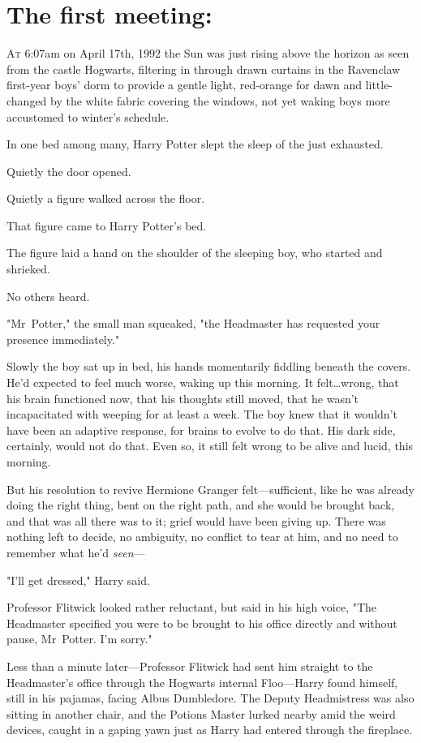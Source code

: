 
\section{The first meeting:}

\lettrine{A}{t} 6:07am on April 17th, 1992 the Sun was just rising above the horizon as seen
from the castle Hogwarts, filtering in through drawn curtains in the Ravenclaw
first-year boys' dorm to provide a gentle light, red-orange for dawn and
little-changed by the white fabric covering the windows, not yet waking boys
more accustomed to winter's schedule.

In one bed among many, Harry Potter slept the sleep of the just exhausted.

Quietly the door opened.

Quietly a figure walked across the floor.

That figure came to Harry Potter's bed.

The figure laid a hand on the shoulder of the sleeping boy, who started and
shrieked.

No others heard.

"Mr~Potter," the small man squeaked, "the Headmaster has requested your
presence immediately."

Slowly the boy sat up in bed, his hands momentarily fiddling beneath the
covers. He'd expected to feel much worse, waking up this morning. It
felt…wrong, that his brain functioned now, that his thoughts still
moved, that he wasn't incapacitated with weeping for at least a week. The boy
knew that it wouldn't have been an adaptive response, for brains to evolve to
do that. His dark side, certainly, would not do that. Even so, it still felt
wrong to be alive and lucid, this morning.

But his resolution to revive Hermione Granger felt—sufficient, like he was
already doing the right thing, bent on the right path, and she would be brought
back, and that was all there was to it; grief would have been giving up. There
was nothing left to decide, no ambiguity, no conflict to tear at him, and no
need to remember what he'd \emph{seen}—

"I'll get dressed," Harry said.

Professor Flitwick looked rather reluctant, but said in his high voice, "The
Headmaster specified you were to be brought to his office directly and without
pause, Mr~Potter. I'm sorry."

Less than a minute later—Professor Flitwick had sent him straight to the
Headmaster's office through the Hogwarts internal Floo—Harry found himself,
still in his pajamas, facing Albus Dumbledore. The Deputy Headmistress was also
sitting in another chair, and the Potions Master lurked nearby amid the weird
devices, caught in a gaping yawn just as Harry had entered through the
fireplace.

